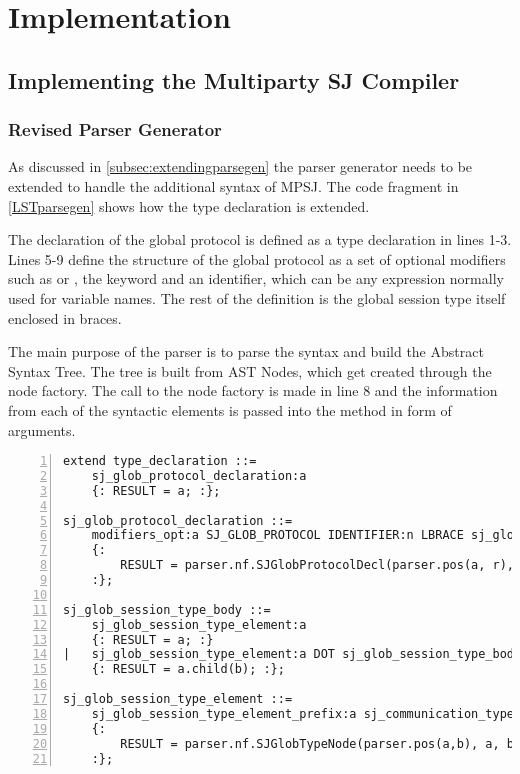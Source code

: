 \cleardoublepage
\chapter{Implementation}
\label{ch:implementation}

\section{Implementing the Multiparty SJ Compiler}

\subsection{Revised Parser Generator}
\label{subsec:ppgimpl}

As discussed in \autoref{subsec:extendingparsegen} the parser generator needs to be extended to handle the additional syntax of MPSJ. The code fragment in \autoref{LSTparsegen} shows how the type declaration is extended. 

The declaration of the global protocol is defined as a type declaration in lines 1-3. Lines 5-9 define the structure of the global protocol as a set of optional modifiers such as  or , the  keyword and an identifier, which can be any expression normally used for variable names. The rest of the definition is the global session type itself enclosed in braces. 

The main purpose of the parser is to parse the syntax and build the Abstract Syntax Tree. The tree is built from AST Nodes, which get created through the node factory. The call to the node factory is made in line 8 and the information from each of the syntactic elements is passed into the method in form of arguments.  

\begin{lstlisting}[basicstyle=\LISTINGSTYLE, numbers=left, caption={Example code fragment showing the language extension to the parser generator}, label={LSTparsegen}]
extend type_declaration ::=
	sj_glob_protocol_declaration:a
	{: RESULT = a; :};

sj_glob_protocol_declaration ::=
	modifiers_opt:a SJ_GLOB_PROTOCOL IDENTIFIER:n LBRACE sj_glob_session_type_body:t RBRACE:r
	{: 
		RESULT = parser.nf.SJGlobProtocolDecl(parser.pos(a, r), a, parser.nf.Id(parser.pos(n), n.getIdentifier()), t); 
	:};

sj_glob_session_type_body ::= 
	sj_glob_session_type_element:a
	{: RESULT = a; :}
|	sj_glob_session_type_element:a DOT sj_glob_session_type_body:b
	{: RESULT = a.child(b); :};

sj_glob_session_type_element ::=
	sj_glob_session_type_element_prefix:a sj_communication_type_elem:b
	{: 
		RESULT = parser.nf.SJGlobTypeNode(parser.pos(a,b), a, b); 
	:};	
\end{lstlisting}

